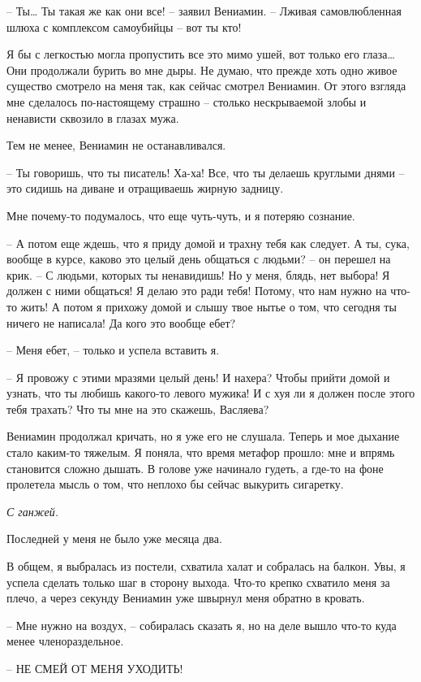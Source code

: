 \documentclass[
]{book}
\begin{document}
-- Ты\ldots{} Ты такая же как они все! -- заявил Вениамин. -- Лживая самовлюбленная шлюха с комплексом самоубийцы -- вот ты кто!

Я бы с легкостью могла пропустить все это мимо ушей, вот только его глаза\ldots{} Они продолжали бурить во мне дыры. Не думаю, что прежде хоть одно живое существо смотрело на меня так, как сейчас смотрел Вениамин. От этого взгляда мне сделалось по-настоящему страшно -- столько нескрываемой злобы и ненависти сквозило в глазах мужа.

Тем не менее, Вениамин не останавливался.

-- Ты говоришь, что ты писатель! Ха-ха! Все, что ты делаешь круглыми днями -- это сидишь на диване и отращиваешь жирную задницу.

Мне почему-то подумалось, что еще чуть-чуть, и я потеряю сознание.

-- А потом еще ждешь, что я приду домой и трахну тебя как следует. А ты, сука, вообще в курсе, каково это целый день общаться с людьми? -- он перешел на крик. -- С людьми, которых ты ненавидишь! Но у меня, блядь, нет выбора! Я должен с ними общаться! Я делаю это ради тебя! Потому, что нам нужно на что-то жить! А потом я прихожу домой и слышу твое нытье о том, что сегодня ты ничего не написала! Да кого это вообще ебет?

-- Меня ебет, -- только и успела вставить я.

-- Я провожу с этими мразями целый день! И нахера? Чтобы прийти домой и узнать, что ты любишь какого-то левого мужика! И с хуя ли я должен после этого тебя трахать? Что ты мне на это скажешь, Васляева?

Вениамин продолжал кричать, но я уже его не слушала. Теперь и мое дыхание стало каким-то тяжелым. Я поняла, что время метафор прошло: мне и впрямь становится сложно дышать. В голове уже начинало гудеть, а где-то на фоне пролетела мысль о том, что неплохо бы сейчас выкурить сигаретку.

\emph{С ганжей.}

Последней у меня не было уже месяца два.

В общем, я выбралась из постели, схватила халат и собралась на балкон. Увы, я успела сделать только шаг в сторону выхода. Что-то крепко схватило меня за плечо, а через секунду Вениамин уже швырнул меня обратно в кровать.

-- Мне нужно на воздух, -- собиралась сказать я, но на деле вышло что-то куда менее членораздельное.

-- НЕ СМЕЙ ОТ МЕНЯ УХОДИТЬ!
\end{document}
